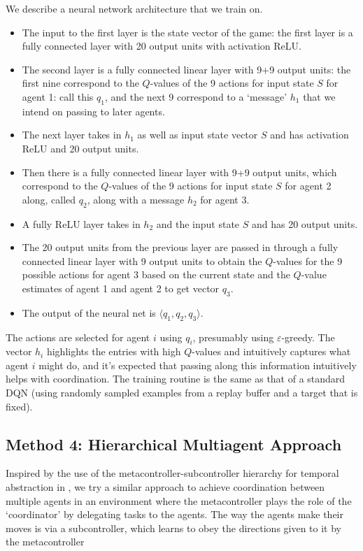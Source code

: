 \documentclass{article}
\begin{document}
We describe a neural network architecture that we train
on.
\begin{itemize}

\item The input to the first layer is the state vector of
the game: the first layer is a fully connected layer
with 20 output units with activation ReLU.

\item The second layer is a fully connected linear layer
with 9+9 output units: the first nine correspond to the $Q$-values
of the 9 actions for input state $S$ for agent 1: call
this $q_1$, and the next 9 correspond to a `message' $h_1$ that
we intend on passing to later agents.

\item The next layer takes in $h_1$ as well as input
state vector $S$ and has activation ReLU and 20 output
units.

\item Then there is a fully connected linear layer with
9+9 output units, which correspond to the $Q$-values
of the 9 actions for input state $S$ for agent 2
along, called $q_2$, along with a message $h_2$
for agent 3.

\item A fully ReLU layer takes in $h_2$ and the input
state $S$ and has 20 output units. 

\item The 20 output units from the previous layer are
passed in through a fully connected linear layer with
9 output units to obtain the $Q$-values for the 9
possible actions for agent 3 based on the current state
and the $Q$-value estimates of agent 1 and agent 2
to get vector $q_3$.

\item The output of the neural net is $\langle q_1,q_2,q_3
\rangle$.

\end{itemize}

The actions are selected for agent $i$ using $q_i$,
presumably using $\varepsilon$-greedy.
The vector $h_i$ highlights the entries with
high $Q$-values and intuitively captures
what agent $i$ might do, and it's expected that
passing along this information intuitively helps
with coordination. The training routine is the same as that
of a standard DQN (using randomly sampled examples from
a replay buffer and a target that is fixed).

\subsection{Method 4: Hierarchical Multiagent Approach}
Inspired by the use of the metacontroller-subcontroller
hierarchy for temporal abstraction in \cite{kulkarni2016hierarchical}, we try a similar approach
to achieve coordination between multiple agents in an
environment where the metacontroller plays the role of the `coordinator' by delegating
tasks to the agents. The way the agents make their moves is via a subcontroller,
which learns to obey the directions given to it by the metacontroller
\end{document}
